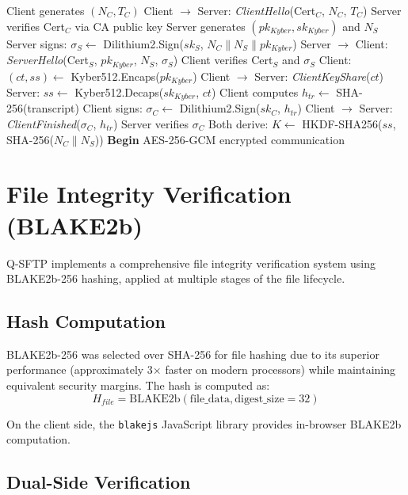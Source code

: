 \begin{algorithm}[H]
\caption{Q-TLS Handshake Protocol}
\label{algo:handshake}
\begin{algorithmic}[1]
\State Client generates $(N_C, T_C)$
\State Client $\rightarrow$ Server: \textit{ClientHello}(Cert$_C$, $N_C$, $T_C$)
\State Server verifies Cert$_C$ via CA public key
\State Server generates $(pk_{Kyber}, sk_{Kyber})$ and $N_S$
\State Server signs: $\sigma_S \gets$ Dilithium2.Sign($sk_S$, $N_C \| N_S \| pk_{Kyber}$)
\State Server $\rightarrow$ Client: \textit{ServerHello}(Cert$_S$, $pk_{Kyber}$, $N_S$, $\sigma_S$)
\State Client verifies Cert$_S$ and $\sigma_S$
\State Client: $(ct, ss) \gets$ Kyber512.Encaps($pk_{Kyber}$)
\State Client $\rightarrow$ Server: \textit{ClientKeyShare}($ct$)
\State Server: $ss \gets$ Kyber512.Decaps($sk_{Kyber}$, $ct$)
\State Client computes $h_{tr} \gets$ SHA-256(transcript)
\State Client signs: $\sigma_C \gets$ Dilithium2.Sign($sk_C$, $h_{tr}$)
\State Client $\rightarrow$ Server: \textit{ClientFinished}($\sigma_C$, $h_{tr}$)
\State Server verifies $\sigma_C$ 
\State Both derive: $K \gets$ HKDF-SHA256($ss$, SHA-256($N_C \| N_S$))
\State \textbf{Begin} AES-256-GCM encrypted communication
\end{algorithmic}
\end{algorithm}

\section{File Integrity Verification (BLAKE2b)}

Q-SFTP implements a comprehensive file integrity verification system using BLAKE2b-256 hashing, applied at multiple stages of the file lifecycle.

\subsection{Hash Computation}

BLAKE2b-256 was selected over SHA-256 for file hashing due to its superior performance (approximately 3$\times$ faster on modern processors) while maintaining equivalent security margins. The hash is computed as:
\[
H_{file} = \text{BLAKE2b}(\text{file\_data}, \text{digest\_size} = 32)
\]

On the client side, the \texttt{blakejs} JavaScript library provides in-browser BLAKE2b computation.

\subsection{Dual-Side Verification}

